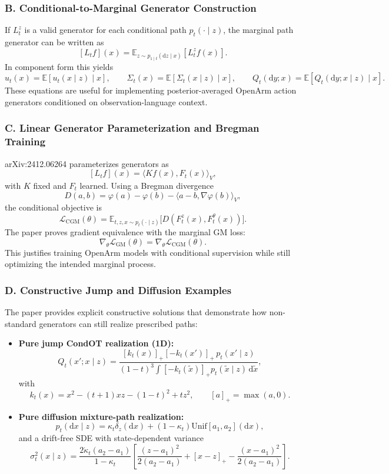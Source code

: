 \documentclass[
]{article}
\theoremstyle{remark}
\begin{document}
\subsubsection{B. Conditional-to-Marginal Generator Construction}

If \(L_t^{z}\) is a valid generator for each conditional path \(p_t(\cdot\mid z)\), the marginal path generator can be written as
\[
[L_t f](x)=\mathbb{E}_{z\sim p_{1\mid t}(\mathrm{d}z\mid x)}\!\left[L_t^{z}f(x)\right].
\]
In component form this yields
\[
u_t(x)=\mathbb{E}[u_t(x\mid z)\mid x],\qquad
\Sigma_t(x)=\mathbb{E}[\Sigma_t(x\mid z)\mid x],\qquad
Q_t(\mathrm{d}y;x)=\mathbb{E}[Q_t(\mathrm{d}y;x\mid z)\mid x].
\]
These equations are useful for implementing posterior-averaged OpenArm action generators conditioned on observation-language context. \cite{gm2025}

\subsubsection{C. Linear Generator Parameterization and Bregman Training}

arXiv:2412.06264 parameterizes generators as
\[
[L_t f](x)=\langle Kf(x),F_t(x)\rangle_V,
\]
with \(K\) fixed and \(F_t\) learned. Using a Bregman divergence
\[
D(a,b)=\varphi(a)-\varphi(b)-\langle a-b,\nabla\varphi(b)\rangle_V,
\]
the conditional objective is
\[
\mathcal{L}_{\mathrm{CGM}}(\theta)
=\mathbb{E}_{t,z,x\sim p_t(\cdot\mid z)}
\bigl[D(F_t^{z}(x),F_t^{\theta}(x))\bigr].
\]
The paper proves gradient equivalence with the marginal GM loss:
\[
\nabla_\theta \mathcal{L}_{\mathrm{GM}}(\theta)
=\nabla_\theta \mathcal{L}_{\mathrm{CGM}}(\theta).
\]
This justifies training OpenArm models with conditional supervision while still optimizing the intended marginal process. \cite{gm2025}

\subsubsection{D. Constructive Jump and Diffusion Examples}

The paper provides explicit constructive solutions that demonstrate how non-standard generators can still realize prescribed paths: \cite{gm2025}
\begin{itemize}
  \item \textbf{Pure jump CondOT realization (1D):}
  \[
  Q_t(x';x\mid z)=\frac{[k_t(x)]_+[-k_t(x')]_+\,p_t(x'\mid z)}
  {(1-t)^3\int[-k_t(\tilde x)]_+p_t(\tilde x\mid z)\,\mathrm{d}\tilde x},
  \]
  with
  \[
  k_t(x)=x^2-(t+1)xz-(1-t)^2+t z^2,\qquad [a]_+=\max(a,0).
  \]
  \item \textbf{Pure diffusion mixture-path realization:}
  \[
  p_t(\mathrm{d}x\mid z)=\kappa_t\delta_z(\mathrm{d}x)+(1-\kappa_t)\mathrm{Unif}[a_1,a_2](\mathrm{d}x),
  \]
  and a drift-free SDE with state-dependent variance
  \[
  \sigma_t^2(x\mid z)=
  \frac{2\dot\kappa_t(a_2-a_1)}{1-\kappa_t}
  \left[
  \frac{(z-a_1)^2}{2(a_2-a_1)}
  +[x-z]_+
  -\frac{(x-a_1)^2}{2(a_2-a_1)}
  \right].
  \]
\end{itemize}
\end{document}
